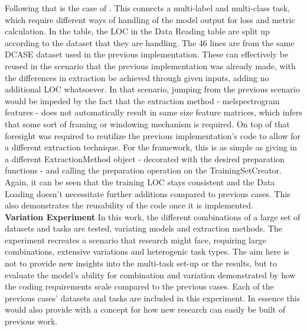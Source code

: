 \textbf{\cite{xu2019multi}} Following that is the case of \citep{xu2019multi}. This connects a multi-label and multi-class task, which require different ways of handling of the model output for loss and metric calculation. In the table, the LOC in the Data Reading table are split up according to the dataset that they are handling. The 46 lines are from the same DCASE dataset used in the previous implementation. These can effectively be reused in the scenario that the previous implementation was already made, with the differences in extraction be achieved through given inputs, adding no additional LOC whatsoever. In that scenario, jumping from the previous scenario would be impeded by the fact that the extraction method - melspectrogram features - does not automatically result in same size feature matrices, which infers that some sort of framing or windowing mechanism is required. On top of that foresight was required to reutilize the previous implementation's code to allow for a different extraction technique. For the framework, this is as simple as giving in a different ExtractionMethod object - decorated with the desired preparation functions - and calling the preparation operation on the TrainingSetCreator. Again, it can be seen that the training LOC stays consistent and the Data Loading doesn't necessitate further additions compared to previous cases. This also demonstrates the reusability of the code once it is implemented.\\

\textbf{Variation Experiment} In this work, the different combinations of a large set of datasets and tasks are tested, variating models and extraction methods. The experiment recreates a scenario that research might face, requiring large combinations, extensive variations and heterogenic task types. The aim here is not to provide new insights into the multi-task set-up or the results, but to evaluate the model's ability for combination and variation demonstrated by how the coding requirements scale compared to the previous cases. Each of the previous cases' datasets and tasks are included in this experiment. In essence this would also provide with a concept for how new research can easily be built of previous work.\\

